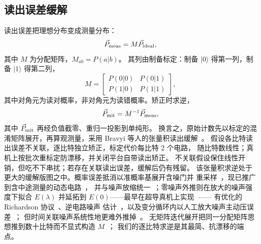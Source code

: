 \subsection{读出误差缓解}
\label{sec:readout}

读出误差把理想分布变成测量分布：
\begin{equation}
\vec{P}_{\rm meas}=M\vec{P}_{\rm ideal},
\end{equation}
其中 $M$ 为分配矩阵，$M_{ab}=P(a|b)$。
其列由制备标定：制备 $|0\rangle$ 得第一列，制备 $|1\rangle$ 得第二列，
\begin{equation}
M=\begin{bmatrix} P(0|0) & P(0|1) \\ P(1|0) & P(1|1) \end{bmatrix},
\end{equation}
其中对角元为读对概率，非对角元为读错概率。矫正时求逆，
\begin{equation}
\vec{P}_{\rm mit}=M^{-1}\vec{P}_{\rm meas},
\end{equation}
其中 $\vec{P}_{\rm mit}$ 再经负值截零、重归一投影到单纯形。
换言之，原始计数先以标定的混淆矩阵展开，再算观测量，采用
Bravyi 等人的张量积读出缓解~\cite{bravyi2021mitigating}。
假设各比特读出误差不关联，逐比特独立矫正，标定代价每比特 $2$ 个电路，
随比特数线性；真机上按批次重标定防漂移，并关闭平台自带读出矫正。
不关联假设保住线性开销，但吃不下串扰；若存在关联读出误差，缓解后仍有残留。
该张量积求逆处于更大的缓解版图之中。概率误差抵消以准概率基展开含噪门并
重采样~\cite{temme2017error}，现已推广到含中途测量的动态电路~\cite{gupta2024probabilistic}，
并与噪声放缩统一~\cite{mari2021extending}；零噪声外推则在放大的噪声强度下拟合
$E(\lambda)$ 并延拓到 $E(0)$——最早在超导真机上实现~\cite{kandala2019error}——
有优化的 Richardson 协议~\cite{krebsbach2022optimization}、逆电路噪声
估计~\cite{koenig2024inverted}，以及变分循环内以人工放大噪声主动压误差~\cite{li2017efficient}；
但时间关联噪声系统性地更难外推掉~\cite{schultz2022analyzing}。
无矩阵迭代展开把同一分配矩阵思想推到数十比特而不显式构造 $M$~\cite{nation2021scalable}；
我们的逐比特求逆是其最简、抗漂移的端点。
